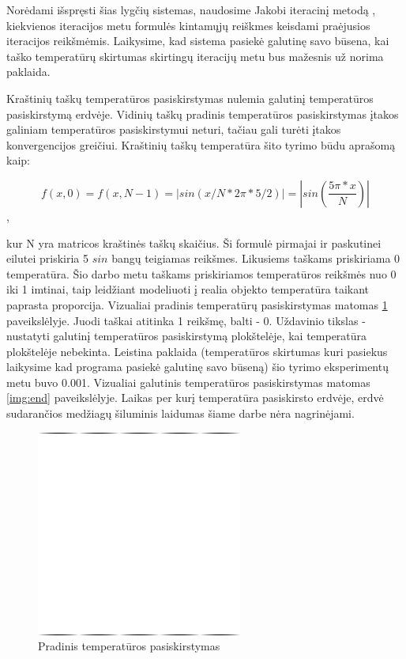 \documentclass{VUMIFPSbakalaurinis}
\begin{document}
Norėdami išspręsti šias lygčių sistemas, naudosime Jakobi iteracinį metodą \cite{burden2011numerical}, kiekvienos iteracijos metu formulės kintamųjų reiškmes keisdami praėjusios iteracijos reikšmėmis.
Laikysime, kad sistema pasiekė galutinę savo būsena, kai taško temperatūrų skirtumas skirtingų iteracijų metu bus mažesnis už norima paklaida.

Kraštinių taškų temperatūros pasiskirstymas nulemia galutinį temperatūros pasiskirstymą erdvėje.
Vidinių taškų pradinis temperatūros pasiskirstymas įtakos galiniam temperatūros pasiskirstymui neturi, tačiau gali turėti įtakos konvergencijos greičiui.
Kraštinių taškų temperatūra šito tyrimo būdu aprašomą kaip:

\[ f(x, 0) = f(x, N-1) = |sin(x/N * 2\pi * 5/2)| = |sin(\frac{5\pi * x}{N})| \], 

kur N yra matricos kraštinės taškų skaičius.
Ši formulė pirmajai ir paskutinei eilutei priskiria 5 $sin$ bangų teigiamas reikšmes.
Likusiems taškams priskiriama 0 temperatūra.
Šio darbo metu taškams priskiriamos temperatūros reikšmės nuo 0 iki 1 imtinai, taip leidžiant modeliuoti į realia objekto temperatūra taikant paprasta proporcija.
Vizualiai pradinis temperatūrų pasiskirstymas matomas \ref{img:start} paveikslėlyje.
Juodi taškai atitinka 1 reikšmę, balti - 0.
Uždavinio tikslas - nustatyti galutinį temperatūros pasiskirstymą plokštelėje, kai temperatūra plokštelėje nebekinta.
Leistina paklaida (temperatūros skirtumas kuri pasiekus laikysime kad programa pasiekė galutinę savo būseną) šio tyrimo eksperimentų metu buvo 0.001.  
Vizualiai galutinis temperatūros pasiskirstymas matomas \ref{img:end} paveikslėlyje.
Laikas per kurį temperatūra pasiskirsto erdvėje, erdvė sudarančios medžiagų šiluminis laidumas šiame darbe nėra nagrinėjami. 

\begin{figure}[H]
    \centering
    \includegraphics[scale=0.7]{img/image_0000000.png}
    \caption{Pradinis temperatūros pasiskirstymas}
    \label{img:start}
\end{figure}
\end{document}
